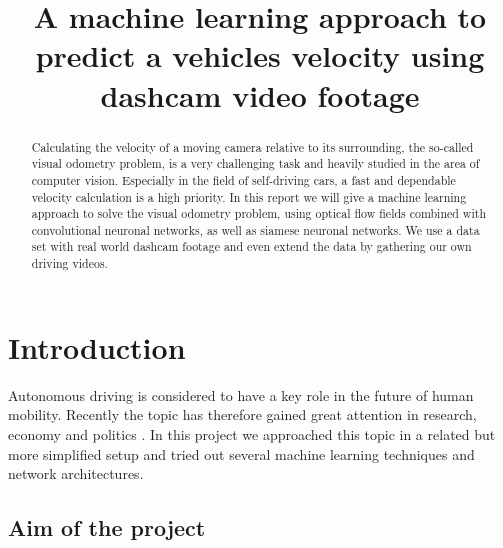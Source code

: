\documentclass[conference]{IEEEtran}
\begin{document}
\title{A machine learning approach to predict a vehicles velocity using dashcam video footage}

\author{
\and
{}
}

\maketitle

\begin{abstract}
Calculating the velocity of a moving camera relative to its surrounding, the so-called visual odometry 
problem, is a very challenging task and heavily studied in the area of computer vision. Especially
in the field of self-driving cars, a fast and dependable velocity calculation is a high priority.
In this report we will give a machine learning approach to solve the visual odometry problem, using 
optical flow fields combined with convolutional neuronal networks, as well as siamese neuronal networks.
We use a data set with real world dashcam footage and even extend the data by gathering our own
driving videos.
\end{abstract}


\section{Introduction}

Autonomous driving is considered to have a key role in the future of human mobility. Recently the topic has therefore gained great attention in research, economy and politics \cite{Maurer2016}. In this project we approached this topic in a related but more simplified setup and tried out several machine learning techniques and network architectures.

\subsection{Aim of the project}
\label{subsec:AimAndMeasure}
\end{document}
